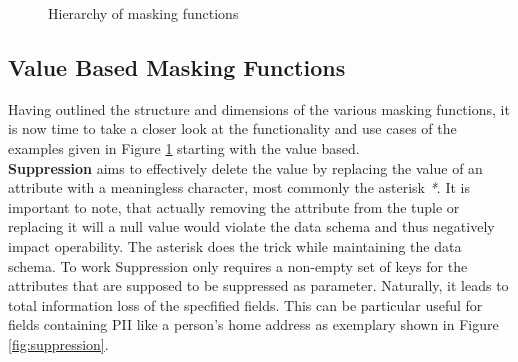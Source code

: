 \begin{figure}[ht]
    \caption{Hierarchy of masking functions}\label{fig:hierarchy_mf} 
\end{figure}

\subsection{Value Based Masking Functions}
Having outlined the structure and dimensions of the various masking functions, it is now time to take a closer look at the functionality and use cases of the examples given in Figure \ref{fig:hierarchy_mf} starting with the value based. \\
\textbf{Suppression} aims to effectively delete the value by replacing the value of an attribute with a meaningless character, most commonly the asterisk \textit{*}. It is important to note, that actually removing the attribute from the tuple or replacing it will a null value would violate the data schema and thus negatively impact operability. The asterisk does the trick while maintaining the data schema. To work Suppression only requires a non-empty set of keys for the attributes that are supposed to be suppressed as parameter. Naturally, it leads to total information loss of the specfified fields. This can be particular useful for fields containing \ac{PII} like a person's home address as exemplary shown in Figure \ref{fig:suppression}. 

